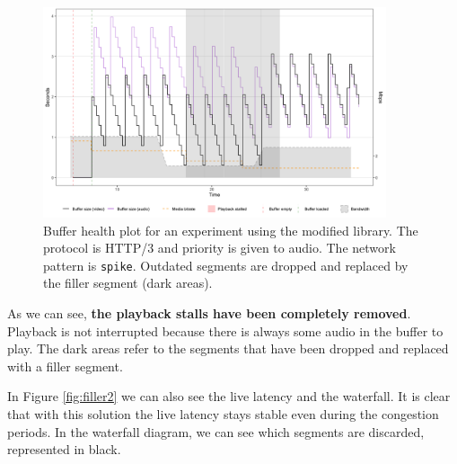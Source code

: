\begin{figure}[h]
    \centering
    \includegraphics[width=0.9\textwidth]{res/impr_hls_filler.png}
    \caption{Buffer health plot for an experiment using the modified \hlsjs{} library. The protocol is HTTP/3 and priority is given to audio. The network pattern is \texttt{spike}. Outdated segments are dropped and replaced by the filler segment (dark areas).}
    \label{fig:filler1}
\end{figure}

As we can see, \textbf{the playback stalls have been completely removed}. Playback is not interrupted because there is always some audio in the buffer to play. The dark areas refer to the segments that have been dropped and replaced with a filler segment.

In Figure \ref{fig:filler2} we can also see the live latency and the waterfall. It is clear that with this solution the live latency stays stable even during the congestion periods. In the waterfall diagram, we can see which segments are discarded, represented in black.

